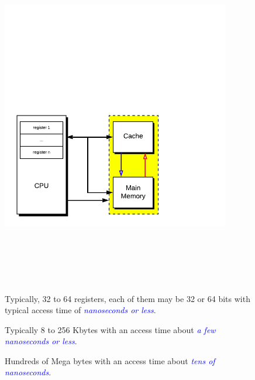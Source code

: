 \documentclass[
  12pt,
  a4paper,
]{report}
\begin{document}
\begin{figure}[h]
    \centering
    \begin{minipage}{0.6\textwidth}
        \centering
        \includegraphics[height=15cm,width=10cm, keepaspectratio=false]{images/processorhierarchy.png}
    \end{minipage}%
    \hspace{0.5cm}
    \begin{minipage}{0.4\textwidth}
        \begin{tcolorbox}[colback=boxbodycol, colframe=boxheadcol, title=\textcolor{red}{\emph{Processor Registers: }}\textcolor{blue}{The smallest and fastest memory for CPU.}]
            Typically, 32 to 64 registers, each of them may be 32 or 64 bits with typical access time of \textcolor{blue}{\emph{nanoseconds or less}}.
        \end{tcolorbox}
        \vspace{10pt}
        \begin{tcolorbox}[colback=boxbodycol, colframe=boxheadcol, title=\textcolor{red}{\emph{Cache Memory: }}\textcolor{blue}{Slower than registers.}]
            Typically 8 to 256 Kbytes with an access time about \textcolor{blue}{\emph{a few nanoseconds or less}}.
        \end{tcolorbox}
        \vspace{10pt}
        \begin{tcolorbox}[colback=boxbodycol, colframe=boxheadcol, title=\textcolor{red}{\emph{Main Memory: }}\textcolor{blue}{Slower than cache memory.}]
            Hundreds of Mega bytes with an access time about \textcolor{blue}{\emph{tens of nanoseconds}}.
        \end{tcolorbox}
    \end{minipage}
\end{figure}
\end{document}
